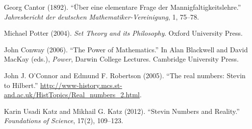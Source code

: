 \documentclass[11pt,a4paper,openany]{book}
\theoremstyle{definition}
\begin{document}
Georg Cantor (1892). ``Über eine elementare Frage der
Mannigfaltigkeitslehre.'' \textit{Jahresbericht der deutschen
Mathematiker-Vereinigung}, 1, 75--78.

Michael Potter (2004). \textit{Set Theory and its Philosophy}.
Oxford University Press.

John Conway (2006). ``The Power of Mathematics.'' In Alan Blackwell
and David MacKay (eds.), \textit{Power}, Darwin College Lectures.
Cambridge University Press.

John J. O'Connor and Edmund F. Robertson (2005). ``The real numbers:
Stevin to Hilbert.''
\url{http://www-history.mcs.st-and.ac.uk/HistTopics/Real_numbers_2.html}.

Karin Usadi Katz and Mikhail G. Katz (2012). ``Stevin Numbers and
Reality.'' \textit{Foundations of Science}, 17(2), 109--123.
\end{document}
